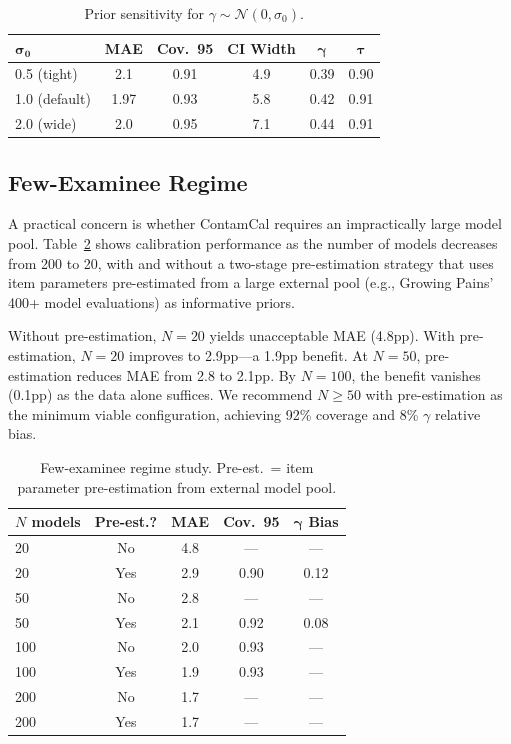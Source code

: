 \documentclass[11pt,letterpaper]{article}
\begin{document}
\begin{table}[t]
\centering
\caption{Prior sensitivity for $\gamma \sim \mathcal{N}(0,\sigma_0)$.}
\label{tab:prior}
\begin{tabular}{lccccc}
\toprule
$\boldsymbol{\sigma_0}$ & \textbf{MAE} & \textbf{Cov.\ 95} & \textbf{CI Width} & $\boldsymbol{\gamma}$ & $\boldsymbol{\tau}$ \\
\midrule
0.5 (tight) & 2.1 & 0.91 & 4.9 & 0.39 & 0.90 \\
1.0 (default) & 1.97 & 0.93 & 5.8 & 0.42 & 0.91 \\
2.0 (wide) & 2.0 & 0.95 & 7.1 & 0.44 & 0.91 \\
\bottomrule
\end{tabular}
\end{table}

\subsection{Few-Examinee Regime}

A practical concern is whether ContamCal requires an impractically large model pool.
Table~\ref{tab:fewex} shows calibration performance as the number of models decreases from 200 to 20, with and without a two-stage pre-estimation strategy that uses item parameters pre-estimated from a large external pool (e.g., Growing Pains' 400+ model evaluations) as informative priors.

Without pre-estimation, $N=20$ yields unacceptable MAE (4.8pp).
With pre-estimation, $N=20$ improves to 2.9pp---a 1.9pp benefit.
At $N=50$, pre-estimation reduces MAE from 2.8 to 2.1pp.
By $N=100$, the benefit vanishes (0.1pp) as the data alone suffices.
We recommend $N \geq 50$ with pre-estimation as the minimum viable configuration, achieving 92\% coverage and 8\% $\gamma$ relative bias.

\begin{table}[t]
\centering
\caption{Few-examinee regime study. Pre-est.\ = item parameter pre-estimation from external model pool.}
\label{tab:fewex}
\begin{tabular}{lcccc}
\toprule
\textbf{$N$ models} & \textbf{Pre-est.?} & \textbf{MAE} & \textbf{Cov.\ 95} & $\boldsymbol{\gamma}$ \textbf{Bias} \\
\midrule
20 & No & 4.8 & --- & --- \\
20 & Yes & 2.9 & 0.90 & 0.12 \\
50 & No & 2.8 & --- & --- \\
50 & Yes & 2.1 & 0.92 & 0.08 \\
100 & No & 2.0 & 0.93 & --- \\
100 & Yes & 1.9 & 0.93 & --- \\
200 & No & 1.7 & --- & --- \\
200 & Yes & 1.7 & --- & --- \\
\bottomrule
\end{tabular}
\end{table}
\end{document}
